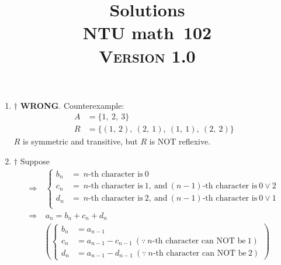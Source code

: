 \documentclass[a4paper,12pt]{article}
\newcommand{\school}{ntu}
\newcommand{\subject}{math}
\renewcommand{\year}{102}
\newcommand{\titlename}{\MakeUppercase{\school} \subject \ \year}
\newcommand{\ver}{\textsc{Version} 1.0} %
\begin{document}
\title{\LARGE{\textbf{Solutions}} \\
	\Huge{\textbf{\titlename}} \\
	\normalsize{\ver}
}
\author{}
\date{}

\maketitle


\begin{enumerate}
	\item \begin{answer}{$\dag$} \textbf{WRONG}. Counterexample: \begin{equation}
            \begin{aligned}
                A & = \{1, \ 2, \ 3\} \\
                R & = \{(1, \ 2), \ (2, \ 1), \ (1, \ 1), \ (2, \ 2) \}    
            \end{aligned}
        \end{equation} $R$ is symmetric and transitive, but $R$ is NOT reflexive.
    \end{answer}
    \item \begin{answer}{$\dag$} Suppose \begin{equation}
            \begin{aligned}
                \Rightarrow & \ \begin{cases}
                    b_n & = \ n\text{-th character is} \ 0 \\
                    c_n & = \ n\text{-th character is} \ 1, \ \text{and} \ (n - 1)\text{-th character is} \ 0 \lor 2 \\
                    d_n & = \ n\text{-th character is} \ 2, \ \text{and} \ (n - 1)\text{-th character is} \ 0 \lor 1 \\
                \end{cases} \\
                \Rightarrow & \ a_n = b_n + c_n + d_n \\
                & \left(\begin{cases}
                    b_n & = a_{n - 1} \\
                    c_n & = a_{n - 1} - c_{n - 1} \ (\because \ n\text{-th character can NOT be} \ 1) \\
                    d_n & = a_{n - 1} - d_{n - 1} \ (\because \ n\text{-th character can NOT be} \ 2)
                \end{cases}\right)

\end{aligned}
\end{equation}
\end{answer}
\end{enumerate}
\end{document}
